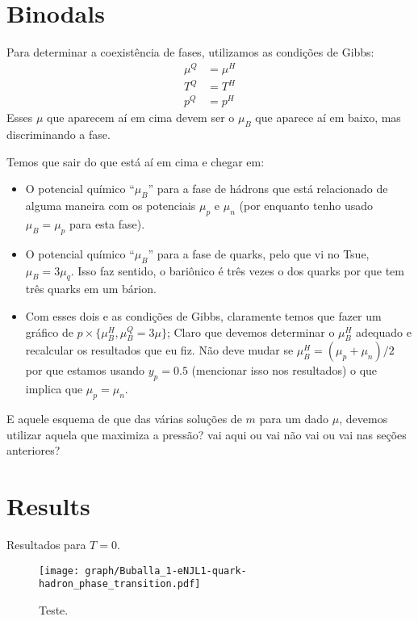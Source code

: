 \documentclass[prc, reprint, amsmath, linenumbers,10pt]{revtex4-1}
\begin{document}
\section{Binodals}

Para determinar a coexistência de fases, utilizamos as condições de Gibbs:
\begin{align}
\mu^Q &= \mu^H \\
T^Q &= T^H \\
p^Q &= p^H
\end{align}
%
Esses $\mu$ que aparecem aí em cima devem ser o $\mu_B$ que aparece aí em baixo, mas discriminando a fase.

Temos que sair do que está aí em cima e chegar em:
\begin{itemize}
	\item O potencial químico ``$\mu_B$'' para a fase de hádrons que está relacionado de alguma maneira com os potenciais $\mu_p$ e $\mu_n$ (por enquanto tenho usado $\mu_B = \mu_p$ para esta fase).
	\item O potencial químico ``$\mu_B$'' para a fase de quarks, pelo que vi no Tsue, $\mu_B = 3 \mu_q$. Isso faz sentido, o bariônico é três vezes o dos quarks por que tem três quarks em um bárion. 
	\item Com esses dois e as condições de Gibbs, claramente temos que fazer um gráfico de $p \times \{\mu_B^H, \mu_B^Q = 3 \mu\}$; Claro que devemos determinar o $\mu_B^H$ adequado e recalcular os resultados que eu fiz. Não deve mudar se $\mu_B^H = (\mu_p + \mu_n)/2$ por que estamos usando $y_p = 0.5$ (mencionar isso nos resultados) o que implica que $\mu_p = \mu_n$. 
\end{itemize}

E aquele esquema de que das várias soluções de $m$ para um dado $\mu$, devemos utilizar aquela que maximiza  a pressão? vai aqui ou vai não vai ou vai nas seções anteriores?

\section{Results}

Resultados para $T = 0$.

\begin{figure}[!htpb]
\texttt{[image: graph/Buballa\_1-eNJL1-quark-hadron\_phase\_transition.pdf]}
\caption{Teste.}
\end{figure}
\end{document}
